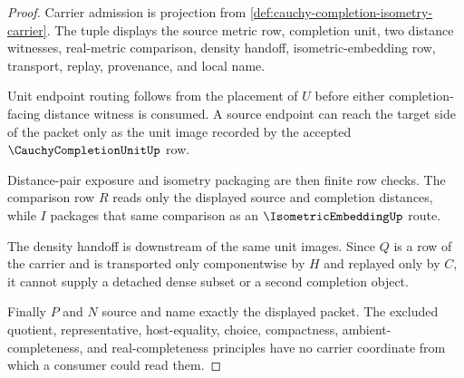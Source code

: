 \begin{proof}
Carrier admission is projection from \autoref{def:cauchy-completion-isometry-carrier}. The tuple displays the source metric row, completion unit, two distance witnesses, real-metric comparison, density handoff, isometric-embedding row, transport, replay, provenance, and local name.

Unit endpoint routing follows from the placement of $U$ before either completion-facing distance witness is consumed. A source endpoint can reach the target side of the packet only as the unit image recorded by the accepted $\CauchyCompletionUnitUp$ row.

Distance-pair exposure and isometry packaging are then finite row checks. The comparison row $R$ reads only the displayed source and completion distances, while $I$ packages that same comparison as an $\IsometricEmbeddingUp$ route.

The density handoff is downstream of the same unit images. Since $Q$ is a row of the carrier and is transported only componentwise by $H$ and replayed only by $C$, it cannot supply a detached dense subset or a second completion object.

Finally $P$ and $N$ source and name exactly the displayed packet. The excluded quotient, representative, host-equality, choice, compactness, ambient-completeness, and real-completeness principles have no carrier coordinate from which a consumer could read them.
\end{proof}

